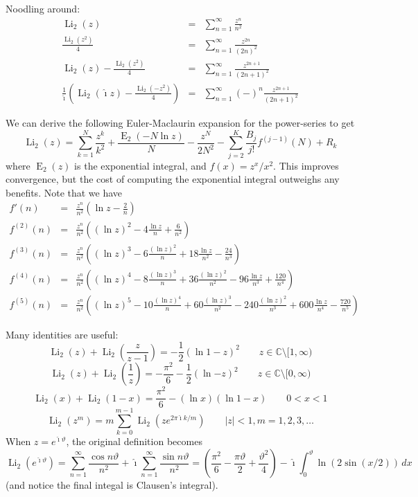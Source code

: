 \documentclass[10pt,dvipdfmx,letterpaper,twoside]{article}
\let\O=\operatorname
\newcommand{\CC}{{\mathbb{C}}}
\newcommand{\ii}{{\hat{\imath}}}
\newenvironment{implementation}{\noindent\begin{framed}}{\end{framed}}
\let\theta=\vartheta
\begin{document}
Noodling around:
\begin{eqnarray*}
\O{Li}_2(z) &=& \sum_{n=1}^\infty \frac{z^n}{n^2} \\
\frac{\O{Li}_2(z^2)}{4} &=& \sum_{n=1}^\infty \frac{z^{2n}}{(2n)^2} \\
\O{Li}_2(z) - \frac{\O{Li}_2(z^2)}{4} &=& \sum_{n=1}^\infty \frac{z^{2n+1}}{(2n+1)^2} \\
\frac{1}{\ii}\left(\O{Li}_2(\ii z) - \frac{\O{Li}_2(-z^2)}{4}\right) &=& \sum_{n=1}^\infty (-)^n \frac{z^{2n+1}}{(2n+1)^2}
\end{eqnarray*}

We can derive the following Euler-Maclaurin expansion for the power-series to get
\[ \O{Li}_2(z) = \sum_{k=1}^N\frac{z^k}{k^2} + \frac{\O{E}_2(-N\ln z)}{N} - \frac{z^N}{2 N^2} - \sum_{j=2}^K \frac{B_j}{j!}f^{(j-1)}(N) + R_k \]
where $\O{E}_2(z)$ is the exponential integral, and $f(x) = z^x/x^2$.  This improves convergence, but the cost of computing the exponential integral
outweighs any benefits.
Note that we have
\begin{eqnarray*}
f'(n) &=& \frac{z^n}{n^2}\left( \ln z - \frac{2}{n} \right) \\
f^{(2)}(n) &=& \frac{z^n}{n^2}\left( (\ln z)^2 - 4\frac{\ln z}{n} + \frac{6}{n^2} \right) \\
f^{(3)}(n) &=& \frac{z^n}{n^2}\left( (\ln z)^3 - 6\frac{(\ln z)^2}{n} + 18\frac{\ln z}{n^2} - \frac{24}{n^3} \right) \\
f^{(4)}(n) &=& \frac{z^n}{n^2}\left( (\ln z)^4 - 8\frac{(\ln z)^3}{n} + 36\frac{(\ln z)^2}{n^2}
    - 96\frac{\ln z}{n^3} + \frac{120}{n^4} \right) \\
f^{(5)}(n) &=& \frac{z^n}{n^2}\left( (\ln z)^5 - 10\frac{(\ln z)^4}{n} + 60\frac{(\ln z)^3}{n^2}
    - 240\frac{(\ln z)^2}{n^3} + 600\frac{\ln z}{n^4} - \frac{720}{n^5} \right)
\end{eqnarray*}

\begin{implementation}
Many identities are useful:
\[ \O{Li}_2(z) + \O{Li}_2(\frac{z}{z-1}) = -\frac12(\ln 1-z)^2 \qquad z\in\CC\setminus[1,\infty) \]
\[ \O{Li}_2(z) + \O{Li}_2(\frac{1}{z}) = -\frac{\pi^2}{6} - \frac12(\ln{-z})^2 \qquad z\in\CC\setminus[0,\infty) \]
\[ \O{Li}_2(x) + \O{Li}_2(1-x) = \frac{\pi^2}{6} - (\ln x)(\ln 1-x) \qquad 0<x<1 \]
\[ \O{Li}_2(z^m) = m\sum_{k=0}^{m-1}\O{Li}_2(z e^{2\pi\ii k/m}) \qquad |z|<1, m=1,2,3,\dots \]
When $z=e^{\ii\theta}$, the original definition becomes
\[ \O{Li}_2(e^{\ii\theta}) = \sum_{n=1}^\infty\frac{\cos n\theta}{n^2} + \ii\sum_{n=1}^\infty\frac{\sin n\theta}{n^2}
    = (\frac{\pi^2}{6} - \frac{\pi\theta}{2} + \frac{\theta^2}{4}) - \ii\int_0^\theta \ln(2\sin(x/2))\,dx \]
(and notice the final integal is Clausen's integral).
\end{implementation}
\end{document}
